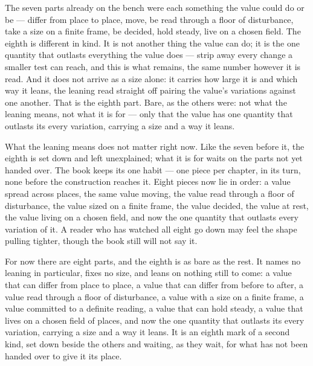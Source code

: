 The seven parts already on the bench were each something the value could do or be --- differ from place to place, move, be read through a floor of disturbance, take a size on a finite frame, be decided, hold steady, live on a chosen field. The eighth is different in kind. It is not another thing the value can do; it is the one quantity that outlasts everything the value does --- strip away every change a smaller test can reach, and this is what remains, the same number however it is read. And it does not arrive as a size alone: it carries how large it is and which way it leans, the leaning read straight off pairing the value's variations against one another. That is the eighth part. Bare, as the others were: not what the leaning means, not what it is for --- only that the value has one quantity that outlasts its every variation, carrying a size and a way it leans.

What the leaning means does not matter right now. Like the seven before it, the eighth is set down and left unexplained; what it is for waits on the parts not yet handed over. The book keeps its one habit --- one piece per chapter, in its turn, none before the construction reaches it. Eight pieces now lie in order: a value spread across places, the same value moving, the value read through a floor of disturbance, the value sized on a finite frame, the value decided, the value at rest, the value living on a chosen field, and now the one quantity that outlasts every variation of it. A reader who has watched all eight go down may feel the shape pulling tighter, though the book still will not say it.

For now there are eight parts, and the eighth is as bare as the rest. It names no leaning in particular, fixes no size, and leans on nothing still to come: a value that can differ from place to place, a value that can differ from before to after, a value read through a floor of disturbance, a value with a size on a finite frame, a value committed to a definite reading, a value that can hold steady, a value that lives on a chosen field of places, and now the one quantity that outlasts its every variation, carrying a size and a way it leans. It is an eighth mark of a second kind, set down beside the others and waiting, as they wait, for what has not been handed over to give it its place.
